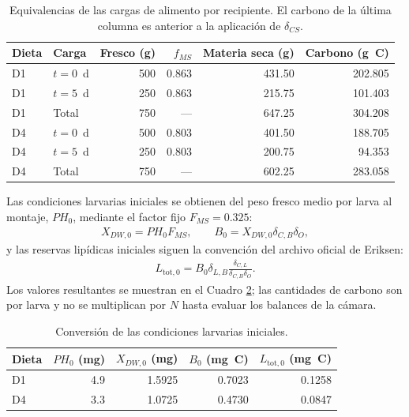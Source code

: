 \begin{table}[htbp]
  \centering
  \small
  \caption{Equivalencias de las cargas de alimento por recipiente. El carbono
  de la última columna es anterior a la aplicación de $\delta_{CS}$.}
  \label{tab:s6-alimento}
  \begin{tabular}{llrrrr}
    \toprule
    Dieta & Carga & Fresco (g) & $f_{MS}$ & Materia seca (g) &
    Carbono (g~C) \\
    \midrule
    D1 & $t=0$~d & 500 & 0.863 & 431.50 & 202.805 \\
    D1 & $t=5$~d & 250 & 0.863 & 215.75 & 101.403 \\
    D1 & Total & 750 & --- & 647.25 & 304.208 \\
    \midrule
    D4 & $t=0$~d & 500 & 0.803 & 401.50 & 188.705 \\
    D4 & $t=5$~d & 250 & 0.803 & 200.75 & 94.353 \\
    D4 & Total & 750 & --- & 602.25 & 283.058 \\
    \bottomrule
  \end{tabular}
\end{table}

Las condiciones larvarias iniciales se obtienen del peso fresco medio por
larva al montaje, $PH_0$, mediante el factor fijo $F_{MS}=0.325$:
\begin{align*}
X_{DW,0}=PH_0F_{MS},\qquad
B_0=X_{DW,0}\delta_{C,B}\delta_O,
\end{align*}
y las reservas lipídicas iniciales siguen la convención del archivo oficial de
Eriksen:
\begin{align*}
L_{\mathrm{tot},0}
  =B_0\delta_{L,B}
  \frac{\delta_{C,L}}{\delta_{C,B}\delta_O}.
\end{align*}
Los valores resultantes se muestran en el Cuadro \ref{tab:s6-iniciales}; las
cantidades de carbono son por larva y no se multiplican por $N$ hasta evaluar
los balances de la cámara.

\begin{table}[htbp]
  \centering
  \small
  \caption{Conversión de las condiciones larvarias iniciales.}
  \label{tab:s6-iniciales}
  \begin{tabular}{lrrrr}
    \toprule
    Dieta & $PH_0$ (mg) & $X_{DW,0}$ (mg) & $B_0$ (mg~C) &
    $L_{\mathrm{tot},0}$ (mg~C) \\
    \midrule
    D1 & 4.9 & 1.5925 & 0.7023 & 0.1258 \\
    D4 & 3.3 & 1.0725 & 0.4730 & 0.0847 \\
    \bottomrule
  \end{tabular}
\end{table}

